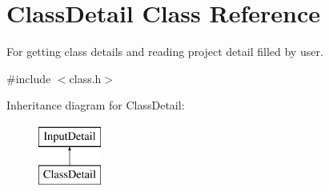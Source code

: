 \hypertarget{classClassDetail}{\section{Class\-Detail Class Reference}
\label{classClassDetail}
}


For getting class details and reading project detail filled by user.  




{\ttfamily \#include $<$class.\-h$>$}

Inheritance diagram for Class\-Detail\-:\begin{figure}[H]
\begin{center}
\leavevmode
\includegraphics[height=2.000000cm]{classClassDetail}
\end{center}
\end{figure}
